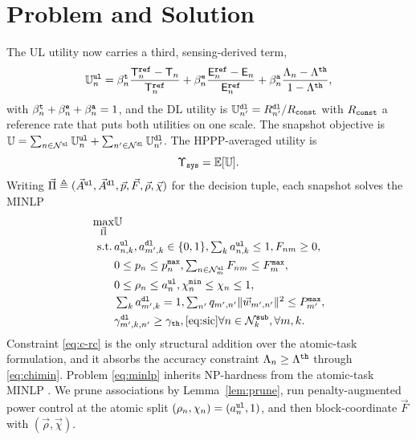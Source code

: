 \documentclass[journal]{IEEEtran}
\begin{document}
\section{Problem and Solution}
\label{sec:sol}
The UL utility now carries a third, sensing-derived term,
\begin{equation}
\mathbb{U}_n^{\tt ul}
=\beta_n^{\tt t}\frac{\mathsf{T}_n^{\tt ref}-\mathsf{T}_n}{\mathsf{T}_n^{\tt ref}}
+\beta_n^{\tt e}\frac{\mathsf{E}_n^{\tt ref}-\mathsf{E}_n}{\mathsf{E}_n^{\tt ref}}
+\beta_n^{\tt a}\frac{\Lambda_n-\Lambda^{\tt th}}{1-\Lambda^{\tt th}},
\label{eq:Uul}
\end{equation}
with $\beta_n^{\tt t}+\beta_n^{\tt e}+\beta_n^{\tt a}=1$, and the DL utility is $\mathbb{U}_{n'}^{\tt dl}=R_{n'}^{\tt dl}/R_{\tt const}$ with $R_{\tt const}$ a reference rate that puts both utilities on one scale. The snapshot objective is $\mathbb{U}=\sum_{n\in\mathcal{N}^{\tt ul}}\mathbb{U}_n^{\tt ul}+\sum_{n'\in\mathcal{N}^{\tt dl}}\mathbb{U}_{n'}^{\tt dl}$. The HPPP-averaged utility is
\begin{equation}
\Upsilon_{\tt sys}
=\mathbb{E}[\mathbb{U}].
\label{eq:upsilon}
\end{equation}
Writing $\vec{\Pi}\triangleq(\vec{A}^{\tt ul},\vec{A}^{\tt dl},\vec{p},\vec{F},\vec{\rho},\vec{\chi})$ for the decision tuple, each snapshot solves the MINLP
\begin{subequations}\label{eq:minlp}
\begin{align}
\max_{\vec{\Pi}}&\mathbb{U}\\
\mathrm{s.t.}\,&a_{n,k}^{\tt ul},a_{m',k}^{\tt dl}\in\{0,1\},\textstyle\sum_k a_{n,k}^{\tt ul}\le1,F_{nm}\ge0,\label{eq:c-a}\\
&0\le p_n\le p_n^{\tt max},\textstyle\sum_{n\in\mathcal{N}_m^{\tt ul}}F_{nm}\le F_m^{\tt max},\label{eq:c-pf}\\
&0\le\rho_n\le a_n^{\tt ul},\chi_n^{\tt min}\le\chi_n\le1,\label{eq:c-rc}\\
&\textstyle\sum_k a_{m',k}^{\tt dl}=1,\textstyle\sum_{n'}q_{m',n'}\Vert\vec{w}_{m',n'}\Vert^2\le P_{m'}^{\tt max},\label{eq:c-dl}\\
&\gamma_{m',k,n'}^{\tt dl}\ge\gamma_{\tt th},\eqref{eq:sic}\forall n\in\mathcal{N}_k^{\tt sub},\forall m,k.\label{eq:c-sic}
\end{align}
\end{subequations}
Constraint \eqref{eq:c-rc} is the only structural addition over the atomic-task formulation, and it absorbs the accuracy constraint $\Lambda_n\ge\Lambda^{\tt th}$ through \eqref{eq:chimin}. Problem \eqref{eq:minlp} inherits NP-hardness from the atomic-task MINLP \cite{Hoang_TCOM_2024}. We prune associations by Lemma~\ref{lem:prune}, run penalty-augmented power control at the atomic split $(\rho_n,\chi_n)=(a_n^{\tt ul},1)$, and then block-coordinate $\vec{F}$ with $(\vec{\rho},\vec{\chi})$.
\end{document}
